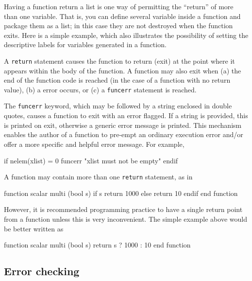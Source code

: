Having a function return a list is one way of permitting the
``return'' of more than one variable.  That is, you can define several
variable inside a function and package them as a list; in this case
they are not destroyed when the function exits.  Here is a simple
example, which also illustrates the possibility of setting the
descriptive labels for variables generated in a function.
%    

A \texttt{return} statement causes the function to return (exit) at
the point where it appears within the body of the function.  A
function may also exit when (a) the end of the function code is
reached (in the case of a function with no return value), (b) a
 error occurs, or (c) a \verb+funcerr+ statement is
reached.

The \verb+funcerr+ keyword, which may be followed by a string enclosed
in double quotes, causes a function to exit with an error flagged.  If
a string is provided, this is printed on exit, otherwise a generic
error message is printed.  This mechanism enables the author of a
function to pre-empt an ordinary execution error and/or offer a more
specific and helpful error message.  For example,
%
\begin{code}
if nelem(xlist) = 0
   funcerr "xlist must not be empty"
endif
\end{code}

A function may contain more than one \texttt{return} statement, as in
%
\begin{code}
function scalar multi (bool s)
   if s
      return 1000
   else
      return 10
   endif
end function
\end{code}
%
However, it is recommended programming practice to have a single
return point from a function unless this is very inconvenient.  The
simple example above would be better written as
%
\begin{code}
function scalar multi (bool s)
   return s ? 1000 : 10
end function
\end{code}
    

\subsection{Error checking}

